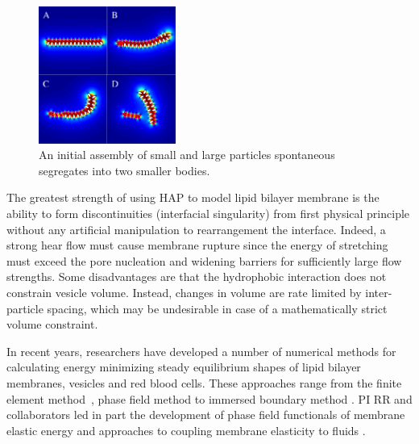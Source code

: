 \begin{figure}
\centerline{\includegraphics[width=0.4\textwidth]{figures/PW_fig2.pdf}}
\caption{\label{fig:demixing} An initial assembly of small and 
large particles spontaneous segregates into two smaller bodies. }
\end{figure}
The greatest strength of using HAP to model lipid bilayer membrane is the ability
to form discontinuities (interfacial singularity) from first physical principle without any artificial manipulation to rearrangement the interface.
 Indeed, a strong hear flow must cause membrane rupture since the 
energy of stretching must exceed the pore nucleation and widening barriers 
for sufficiently large flow strengths. 
Some disadvantages are that the hydrophobic interaction does not constrain vesicle volume. 
Instead, changes in volume are rate limited by inter-particle spacing,
which may be undesirable in case of a mathematically strict volume constraint.

In recent years, researchers have developed a number of numerical methods for calculating
energy minimizing steady equilibrium shapes of lipid bilayer membranes, vesicles and red blood cells.
These approaches range from the finite element method~\cite{Bartels,Peng13,RyKlYaCo16,Sinha15}, 
phase field method \cite{Du05,QiangDu08,Lowengrub13} to immersed
boundary method  \cite{Hu,Hu13, KimLai2010_JCP}.
PI RR and collaborators led in part the development of phase field
functionals of membrane elastic energy and approaches to coupling membrane elasticity to fluids  \cite{0951-7715-18-3-016,Du05,DuEuler,QiangDu09}.




